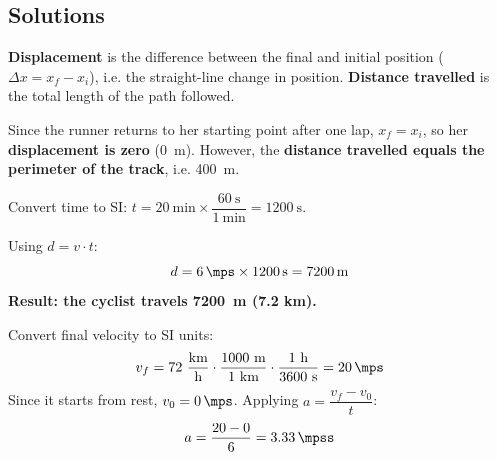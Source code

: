 \documentclass[11pt,a4paper]{article}
\begin{document}



\subsection*{Solutions}

\begin{solucioneng}
\textbf{Displacement} is the difference between the final and initial position ($\Delta x = x_f - x_i$), i.e. the straight-line change in position. \textbf{Distance travelled} is the total length of the path followed.

Since the runner returns to her starting point after one lap, $x_f = x_i$, so her \textbf{displacement is zero} (\qty{0}{\m}). However, the \textbf{distance travelled equals the perimeter of the track}, i.e. \qty{400}{\m}.
\end{solucioneng}

\begin{solucioneng}
Convert time to SI: $t = 20\ \text{min} \times \dfrac{60\ \text{s}}{1\ \text{min}} = \qty{1200}{\s}$.

Using $d = v \cdot t$:
\[
d = \qty{6}{\mps} \times \qty{1200}{\s} = \qty{7200}{\m}
\]
\textbf{Result: the cyclist travels \qty{7200}{\m} (7.2 km).}
\end{solucioneng}

\begin{solucioneng}
Convert final velocity to SI units:
\[
v_f = 72\ \dfrac{\text{km}}{\text{h}} \cdot \dfrac{1000\ \text{m}}{1\ \text{km}} \cdot \dfrac{1\ \text{h}}{3600\ \text{s}} = \qty{20}{\mps}
\]
Since it starts from rest, $v_0 = \qty{0}{\mps}$. Applying $a = \dfrac{v_f - v_0}{t}$:
\[
a = \dfrac{20 - 0}{6} = \qty{3.33}{\mpss}
\]
\end{solucioneng}
\end{document}
